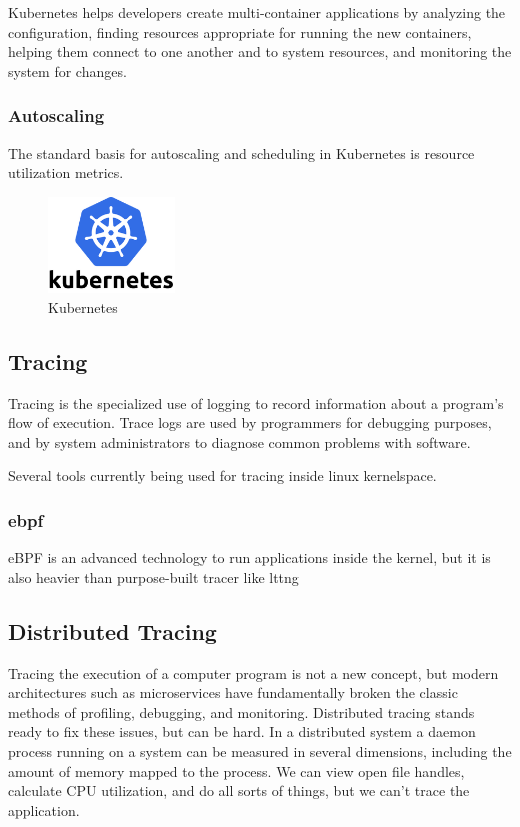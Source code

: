 \documentclass[conference]{IEEEtran}
\begin{document}
Kubernetes helps developers create multi-container applications by analyzing the configuration, finding resources appropriate for running the new containers, helping them connect to one another and to system resources, and monitoring the system for changes.


\subsubsection{Autoscaling}
The standard basis for autoscaling and scheduling in Kubernetes is resource utilization metrics.

\begin{figure}[!h]
    \begin{center}
        \includegraphics[width=0.3\textwidth]{figures/kubernetes.png}
    \end{center}
    \caption{Kubernetes}
    \label{fig:Kubernetes}
\end{figure}

\subsection{Tracing}

Tracing is the specialized use of logging to record information about a program’s flow of execution.
Trace logs are used by programmers for debugging purposes, and by system administrators to diagnose common problems with software.

Several tools currently being used for tracing inside linux kernelspace. 

\subsubsection{ebpf}

eBPF is an advanced technology to run applications inside the kernel, but it is also heavier than purpose-built tracer like lttng

\subsection{Distributed Tracing}
                                                                                                                     Tracing the execution of a computer program is not a new concept, but modern architectures such as microservices have fundamentally broken the classic methods of profiling, debugging, and monitoring. Distributed tracing stands ready to fix these issues, but can be hard.
                                                                                                                     In a distributed system a daemon process running on a system can be measured in several dimensions, including the amount of memory mapped to the process. We can view open file handles, calculate CPU utilization, and do all sorts of things, but we can't trace the application.
\end{document}
